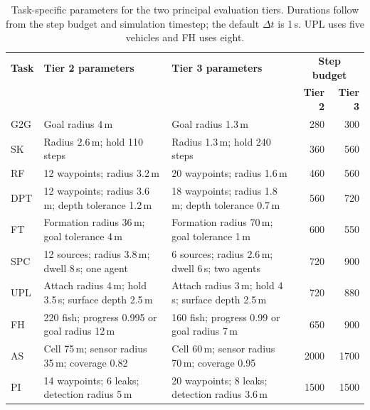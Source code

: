 \begin{table}[t]
\centering\scriptsize
\setlength{\tabcolsep}{4pt}
\renewcommand{\arraystretch}{1.13}
\begin{tabularx}{\textwidth}{l X X r r}
\toprule
\textbf{Task} & \textbf{Tier 2 parameters} & \textbf{Tier 3 parameters} & \multicolumn{2}{c}{\textbf{Step budget}}\\
 & & & \textbf{Tier 2} & \textbf{Tier 3}\\
\midrule
G2G & Goal radius 4\,m & Goal radius 1.3\,m & 280 & 300\\
SK & Radius 2.6\,m; hold 110 steps & Radius 1.3\,m; hold 240 steps & 360 & 560\\
RF & 12 waypoints; radius 3.2\,m & 20 waypoints; radius 1.6\,m & 460 & 560\\
DPT & 12 waypoints; radius 3.6\,m; depth tolerance 1.2\,m & 18 waypoints; radius 1.8\,m; depth tolerance 0.7\,m & 560 & 720\\
FT & Formation radius 36\,m; goal tolerance 4\,m & Formation radius 70\,m; goal tolerance 1\,m & 600 & 550\\
SPC & 12 sources; radius 3.8\,m; dwell 8\,s; one agent & 6 sources; radius 2.6\,m; dwell 6\,s; two agents & 720 & 900\\
UPL & Attach radius 4\,m; hold 3.5\,s; surface depth 2.5\,m & Attach radius 3\,m; hold 4\,s; surface depth 2.5\,m & 720 & 880\\
FH & 220 fish; progress 0.995 or goal radius 12\,m & 160 fish; progress 0.99 or goal radius 7\,m & 650 & 900\\
AS & Cell 75\,m; sensor radius 35\,m; coverage 0.82 & Cell 60\,m; sensor radius 70\,m; coverage 0.95 & 2000 & 1700\\
PI & 14 waypoints; 6 leaks; detection radius 5\,m & 20 waypoints; 8 leaks; detection radius 3.6\,m & 1500 & 1500\\
\bottomrule
\end{tabularx}
\caption{Task-specific parameters for the two principal evaluation tiers. Durations follow from the step budget and simulation timestep; the default $\Delta t$ is 1\,s. UPL uses five vehicles and FH uses eight.}
\label{tab:app_task_thresholds}
\end{table}
